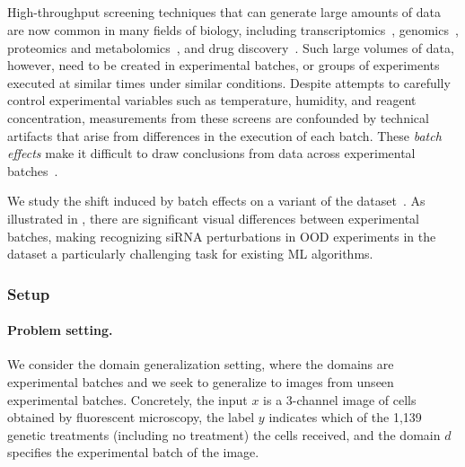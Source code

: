 \subsection{\RxRx}\label{sec:app_rxrx1}

High-throughput screening techniques that can generate large amounts of data
are now common in many fields of biology,
including transcriptomics~\citep{harrill2019tox},
genomics~\citep{echeverri2006high,zhou2014high}, proteomics and
metabolomics~\citep{taylor2021spatially}, and drug
discovery~\citep{broach1996high, macarron2011impact, swinney2011were,
boutros2015microscopy}.
Such large volumes of data, however, need to be created in experimental batches, or groups of experiments executed at similar times under similar conditions.
Despite attempts to carefully control experimental variables such as
temperature, humidity, and reagent concentration, measurements from
these screens are confounded by technical artifacts that arise from differences
in the execution of each batch.
These \emph{batch effects} make it difficult to draw conclusions from data  across experimental batches~\citep{leek2010tackling,parker2012practical,soneson2014batch,nygaard2016methods,caicedo2017data}.

We study the shift induced by batch effects on a variant of the \RxRx
dataset~\citep{taylor2019rxrx1}.
As illustrated in , there are significant visual
differences between experimental batches, making recognizing siRNA perturbations
in OOD experiments in the \RxRx dataset a particularly challenging task for
existing ML algorithms.

\subsubsection{Setup}\label{sec:app_rxrx1_setup}

\paragraph{Problem setting.}
We consider the domain generalization setting, where the domains are
experimental batches and we seek to generalize to images from unseen experimental
batches. Concretely, the input $x$ is a 3-channel image of cells obtained by
fluorescent microscopy, the label $y$ indicates which of the 1,139 genetic
treatments (including no treatment) the cells received, and the domain $d$
specifies the experimental batch of the image.

